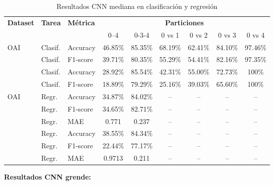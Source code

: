 \documentclass[11pt,spanish,listoffigures,listoftables]{tfgetsinf}
\begin{document}
\begin{table}[h]
    \centering
    \caption{Resultados CNN mediana en clasificación y regresión}
    \label{tab:cnn_mediana_results}
    \begin{tabular}{@{} l l l c c c c c c @{}} 
      \toprule
      \textbf{Dataset} & \textbf{Tarea} & \textbf{Métrica} 
        & \multicolumn{6}{c}{\textbf{Particiones}} \\
      \cmidrule(lr){4-9}
      & & & 0--4 & 0-3-4 & 0 vs 1 & 0 vs 2 & 0 vs 3 & 0 vs 4 \\
      \midrule
      \multirow{2}{*}{OAI}
        & Clasif. & Accuracy   & 46.85\% & 85.35\% & 68.19\% & 62.41\% & 84.10\% & 97.46\% \\
        & Clasif. & F1-score   & 39.71\% & 80.35\% & 55.29\% & 54.41\% & 82.16\% & 97.35\% \\
      \addlinespace
      \multirow{2}{*}{Gatos}
        & Clasif. & Accuracy   & 28.92\% & 85.54\% & 42.31\% & 55.00\% & 72.73\% & 100\% \\
        & Clasif. & F1-score   & 18.89\% & 79.29\% & 25.16\% & 39.03\% & 65.60\% & 100\% \\
      \midrule
      \multirow{3}{*}{OAI}
        & Regr.   & Accuracy   & 34.87\% & 84.02\% & -- & -- & -- & -- \\
        & Regr.   & F1-score   & 34.65\% & 82.71\% & -- & -- & -- & -- \\
        & Regr.   & MAE        & 0.771 & 0.237 & -- & -- & -- & -- \\
      \addlinespace
      \multirow{3}{*}{Gatos}
        & Regr.   & Accuracy   & 38.55\% & 84.34\% & -- & -- & -- & -- \\
        & Regr.   & F1-score   & 22.44\% & 77.17\% & -- & -- & -- & -- \\
        & Regr.   & MAE        & 0.9713 & 0.211 & -- & -- & -- & -- \\
      \bottomrule
    \end{tabular}
\end{table}

\textbf{Resultados CNN grende:}
 
\end{document}

